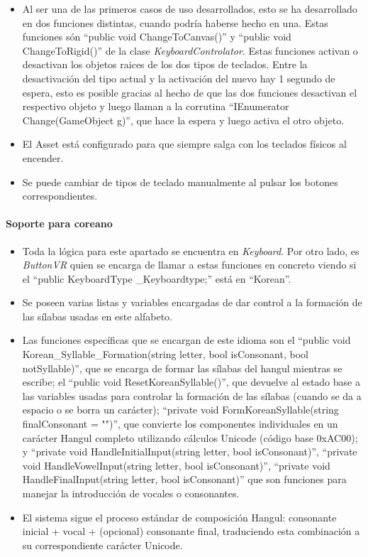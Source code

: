 \begin{itemize}
	\item Al ser una de las primeros casos de uso desarrollados, esto se ha desarrollado en dos funciones distintas, cuando podría haberse hecho en una.
	Estas funciones són ``public void ChangeToCanvas()'' y ``public void ChangeToRigid()'' de la clase \textit{KeyboardControlator}. Estas funciones activan o desactivan los objetos raices de los dos tipos de teclados. Entre la desactivación del tipo actual y la activación del nuevo hay 1 segundo de espera, esto es posible gracias al hecho de que las dos funciones desactivan el respectivo objeto y luego llaman a la corrutina ``IEnumerator Change(GameObject g)'', que hace la espera y luego activa el otro objeto.
	\item El Asset está configurado para que siempre salga con los teclados físicos al encender.
	
	\item Se puede cambiar de tipos de teclado manualmente al pulsar los botones correspondientes.
	
\end{itemize}

\paragraph{\qquad Soporte para coreano} 
\hfill \break %

\begin{itemize}
	\item Toda la lógica para este apartado se encuentra en \textit{Keyboard}. Por otro lado, es \textit{ButtonVR} quien se encarga de llamar a estas funciones en concreto viendo si el ``public KeyboardType \_Keyboardtype;'' está en ``Korean''.
	\item Se poseen varias listas y variables encargadas de dar control a la formación de las sílabas usadas en este alfabeto.
	\item Las funciones específicas que se encargan de este idioma son el ``public void Korean\_Syllable\_Formation(string letter, bool isConsonant, bool notSyllable)'', que se encarga de formar las sílabas del hangul mientras se escribe; el ``public void ResetKoreanSyllable()'', que devuelve al estado base a las variables usadas para controlar la formación de las sílabas (cuando se da a espacio o se borra un carácter); ``private void FormKoreanSyllable(string finalConsonant = "")'', que convierte los componentes individuales en un carácter Hangul completo utilizando cálculos Unicode (código base 0xAC00); y ``private void HandleInitialInput(string letter, bool isConsonant)'', ``private void HandleVowelInput(string letter, bool isConsonant)'', ``private void HandleFinalInput(string letter, bool isConsonant)'' que son funciones para manejar la introducción de vocales o consonantes.
	\item El sistema sigue el proceso estándar de composición Hangul: consonante inicial + vocal + (opcional) consonante final, traduciendo esta combinación a su correspondiente carácter Unicode.
	
\end{itemize}

